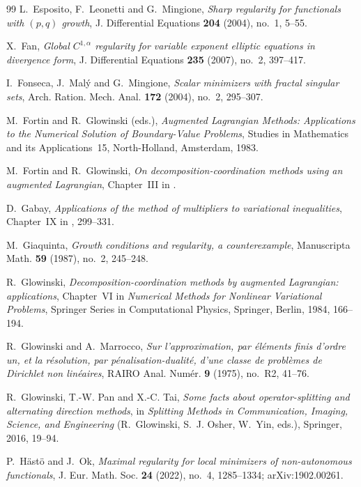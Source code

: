 \documentclass[11pt]{amsart}
\theoremstyle{definition}
\theoremstyle{remark}
\numberwithin{equation}{section}
\begin{document}
\begin{thebibliography}{99}
L.~Esposito, F.~Leonetti and G.~Mingione, \emph{Sharp regularity for functionals with $(p,q)$ growth}, J. Differential Equations \textbf{204} (2004), no.~1, 5--55.

X.~Fan, \emph{Global $C^{1,\alpha}$ regularity for variable exponent elliptic equations in divergence form}, J. Differential Equations \textbf{235} (2007), no.~2, 397--417.

I.~Fonseca, J.~Mal\'y and G.~Mingione, \emph{Scalar minimizers with fractal singular sets}, Arch. Ration. Mech. Anal. \textbf{172} (2004), no.~2, 295--307.

M.~Fortin and R.~Glowinski (eds.), \emph{Augmented Lagrangian Methods: Applications to the Numerical Solution of Boundary-Value Problems}, Studies in Mathematics and its Applications~15, North-Holland, Amsterdam, 1983.

M.~Fortin and R.~Glowinski, \emph{On decomposition-coordination methods using an augmented Lagrangian}, Chapter~III in \cite{FortinGlowinski1983}.

D.~Gabay, \emph{Applications of the method of multipliers to variational inequalities}, Chapter~IX in \cite{FortinGlowinski1983}, 299--331.

M.~Giaquinta, \emph{Growth conditions and regularity, a counterexample}, Manuscripta Math. \textbf{59} (1987), no.~2, 245--248.

R.~Glowinski, \emph{Decomposition-coordination methods by augmented Lagrangian: applications}, Chapter~VI in \emph{Numerical Methods for Nonlinear Variational Problems}, Springer Series in Computational Physics, Springer, Berlin, 1984, 166--194.

R.~Glowinski and A.~Marrocco, \emph{Sur l'approximation, par \'el\'ements finis d'ordre un, et la r\'esolution, par p\'enalisation-dualit\'e, d'une classe de probl\`emes de Dirichlet non lin\'eaires}, RAIRO Anal. Num\'er. \textbf{9} (1975), no.~R2, 41--76.

R.~Glowinski, T.-W. Pan and X.-C. Tai, \emph{Some facts about operator-splitting and alternating direction methods}, in \emph{Splitting Methods in Communication, Imaging, Science, and Engineering} (R.~Glowinski, S.~J. Osher, W.~Yin, eds.), Springer, 2016, 19--94.

P.~H\"ast\"o and J.~Ok, \emph{Maximal regularity for local minimizers of non-autonomous functionals}, J. Eur. Math. Soc. \textbf{24} (2022), no.~4, 1285--1334; arXiv:1902.00261.


\end{thebibliography}
\end{document}
